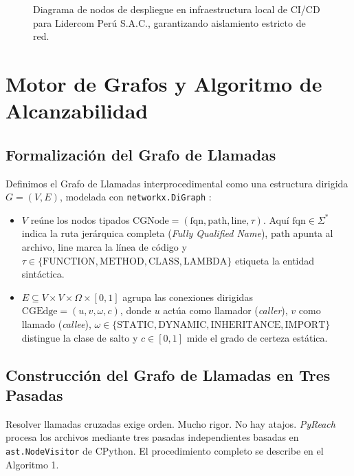 \documentclass[conference]{IEEEtran}
\begin{document}
\begin{figure}[!htbp]
{
}
\caption{Diagrama de nodos de despliegue en infraestructura local de CI/CD para Lidercom Perú S.A.C., garantizando aislamiento estricto de red.}
\label{fig:nodos_infraestructura}
\end{figure}

\section{Motor de Grafos y Algoritmo de Alcanzabilidad}

\subsection{Formalización del Grafo de Llamadas}
Definimos el Grafo de Llamadas interprocedimental como una estructura dirigida $G = (V, E)$, modelada con \texttt{networkx.DiGraph} \cite{hagberg2008exploring}:
\begin{itemize}
    \item $V$ reúne los nodos tipados $\text{CGNode} = (\text{fqn}, \text{path}, \text{line}, \tau)$. Aquí $\text{fqn} \in \Sigma^*$ indica la ruta jerárquica completa (\textit{Fully Qualified Name}), $\text{path}$ apunta al archivo, $\text{line}$ marca la línea de código y $\tau \in \{\text{FUNCTION}, \text{METHOD}, \text{CLASS}, \text{LAMBDA}\}$ etiqueta la entidad sintáctica.
    \item $E \subseteq V \times V \times \Omega \times [0, 1]$ agrupa las conexiones dirigidas $\text{CGEdge} = (u, v, \omega, c)$, donde $u$ actúa como llamador (\textit{caller}), $v$ como llamado (\textit{callee}), $\omega \in \{\text{STATIC}, \text{DYNAMIC}, \text{INHERITANCE}, \text{IMPORT}\}$ distingue la clase de salto y $c \in [0, 1]$ mide el grado de certeza estática.
\end{itemize}

\subsection{Construcción del Grafo de Llamadas en Tres Pasadas}
Resolver llamadas cruzadas exige orden. Mucho rigor. No hay atajos. \textit{PyReach} procesa los archivos mediante tres pasadas independientes basadas en \texttt{ast.NodeVisitor} de CPython. El procedimiento completo se describe en el Algoritmo 1.
\end{document}
